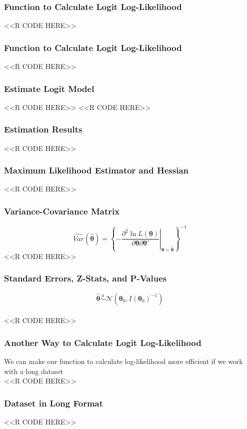 \documentclass{beamer}
\begin{document}
\begin{frame}[fragile]\frametitle{Function to Calculate Logit Log-Likelihood}
	\vspace{1ex}
    <<R CODE HERE>>
\end{frame}

\begin{frame}[fragile]\frametitle{Function to Calculate Logit Log-Likelihood}
    <<R CODE HERE>>
\end{frame}

\begin{frame}[fragile]\frametitle{Estimate Logit Model}
    <<R CODE HERE>>
    \vspace{2ex}
    <<R CODE HERE>>
\end{frame}

\begin{frame}[fragile]\frametitle{Estimation Results}
	\vspace{1ex}
    <<R CODE HERE>>
\end{frame}

\begin{frame}[fragile]\frametitle{Maximum Likelihood Estimator and Hessian}
    <<R CODE HERE>>
\end{frame}

\begin{frame}[fragile]\frametitle{Variance-Covariance Matrix}
	$$\widehat{Var}(\widehat{\bm{\theta}}) = \left\{ \left. -\frac{\partial^2 \ln L(\bm{\theta})}{\partial \bm{\theta} \partial \bm{\theta}'} \right\vert_{\bm{\theta} = \widehat{\bm{\theta}}} \right\}^{-1}$$
    <<R CODE HERE>>
\end{frame}

\begin{frame}[fragile]\frametitle{Standard Errors, Z-Stats, and P-Values}
    $$\widehat{\bm{\theta}} \overset{a}{\sim} \mathcal{N} \left( \bm{\theta}_0, I(\bm{\theta}_0)^{-1} \right)$$ \\
    \vspace{2ex}
    <<R CODE HERE>>
\end{frame}

\begin{frame}[fragile]\frametitle{Another Way to Calculate Logit Log-Likelihood}
	We can make our function to calculate log-likelihood more efficient if we work with a long dataset \\
    <<R CODE HERE>>
\end{frame}

\begin{frame}[fragile]\frametitle{Dataset in Long Format}
    <<R CODE HERE>>
\end{frame}
\end{document}
